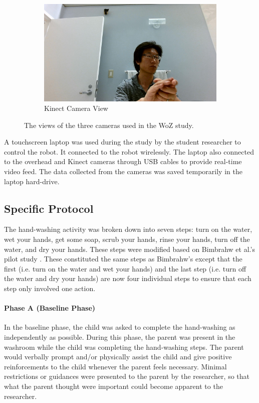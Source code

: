 \documentclass{ut-thesis}
\begin{document}
\begin{figure}[H]
	
	\begin{subfigure}[b]{0.49\textwidth}
		\includegraphics[width=1.1\linewidth]{./img/kinect_view}
		\caption{Kinect Camera View}
	\end{subfigure}%

	\caption{The views of the three cameras used in the WoZ study.}
	\label{fig:CameraViews}
\end{figure}


A touchscreen laptop was used during the study by the student researcher to control the robot. It connected to the robot wirelessly. The laptop also connected to the overhead and Kinect cameras through USB cables to provide real-time video feed. The data collected from the cameras was saved temporarily in the laptop hard-drive.

\subsection{Specific Protocol}
\label{sec:SpecificProtocol}
The hand-washing activity was broken down into seven steps: turn on the water, wet your hands, get some soap, scrub your hands, rinse your hands, turn off the water, and dry your hands.  These steps were modified based on Bimbrahw et al.'s pilot study \cite{bimbrahw2012investigating}. These constituted the same steps as Bimbrahw's except that the first (i.e. turn on the water and wet your hands) and the last step (i.e. turn off the water and dry your hands) are now four individual steps to ensure that each step only involved one action.

\paragraph{Phase A (Baseline Phase)}
In the baseline phase, the child was asked to complete the hand-washing as independently as possible. During this phase, the parent was present in the washroom while the child was completing the hand-washing steps. The parent would verbally prompt and/or physically assist the child and give positive reinforcements to the child whenever the parent feels necessary.  Minimal restrictions or guidances were presented to the parent by the researcher, so that what the parent thought were important could become apparent to the researcher.
\end{document}

